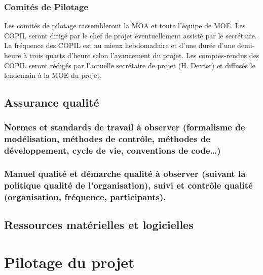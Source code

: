 \documentclass[11pt,a4paper,titlepage,openright]{report}
\begin{document}
    \subsection{Comités de Pilotage}
    Les comités de pilotage rassembleront la MOA et toute l’équipe de MOE. Les COPIL seront dirigé par le chef de projet éventuellement assisté par le secrétaire.
    \\La fréquence des COPIL est au mieux hebdomadaire et d’une durée d’une demi-heure à trois quarts d’heure selon l’avancement du projet.
    Les comptes-rendus des COPIL seront rédigés par l’actuelle secrétaire de projet (H. Dexter) et diffusés le lendemain à la MOE du projet.


    \section{Assurance qualité}
    \subsection{Normes et standards de travail à observer (formalisme de modélisation, méthodes de contrôle, méthodes de développement, cycle de vie, conventions de code…)}
    \subsection{Manuel qualité et démarche qualité à observer (suivant la politique qualité de l’organisation), suivi et contrôle qualité (organisation, fréquence, participants).}


    \section{Ressources matérielles et logicielles}


    \chapter{Pilotage du projet}
\end{document}
